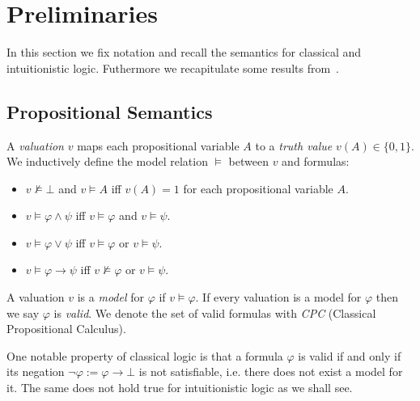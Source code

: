 \documentclass[runningheads]{llncs}
\begin{document}
\section{Preliminaries}

In this section we fix notation and recall the semantics for classical and intuitionistic logic. Futhermore we recapitulate some results from~\cite{otten2005clausal}.

\subsection{Propositional Semantics}

\begin{definition}
	A \emph{valuation} $v$ maps each propositional variable $A$ to a \emph{truth value} $v(A)\in\{0, 1\}$. We inductively define the model relation $\models$ between $v$ and formulas:
	\begin{itemize}
		\item $v\not\models \bot$ and $v\models A$ iff $v(A) = 1$ for each propositional variable $A$.
		\item $v\models \varphi\wedge\psi$ iff $v\models\varphi$ and $v\models\psi$.
		\item $v\models\varphi\vee\psi$ iff $v\models\varphi$ or $v\models\psi$.
		\item $v\models\varphi\to \psi$ iff $v\not\models\varphi$ or $v\models\psi$.
	\end{itemize}
	A valuation $v$ is a \emph{model} for $\varphi$ if $v\models\varphi$. If every valuation is a model for $\varphi$ then we say $\varphi$ is \emph{valid}. We denote the set of valid formulas with \emph{CPC} (Classical Propositional Calculus).
\end{definition}

One notable property of classical logic is that a formula $\varphi$ is valid if and only if its negation $\neg\varphi := \varphi\to\bot$ is not satisfiable, i.e. there does not exist a model for it. The same does not hold true for intuitionistic logic as we shall see.
\end{document}
